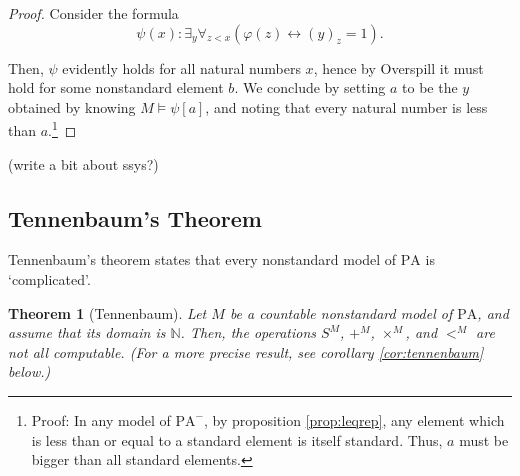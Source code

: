 \documentclass{article}
\newtheorem{theorem}{Theorem}[subsection]
\theoremstyle{nonumberplain}
\newtheorem{proof}{Proof}
\newcommand{\N}{\mathbb{N}}
\newcommand{\PA}{\mathrm{PA}}
\newcommand{\WPA}{\PA^-}
\begin{document}
\begin{proof}
Consider the formula
\begin{equation}
\psi(x) \colon \exists_y \forall_{z < x} (\varphi(z) \leftrightarrow (y)_z = 1).
\end{equation}

Then, $\psi$ evidently holds for all natural numbers $x$, hence by Overspill it must hold for some nonstandard element $b$. We conclude by setting $a$ to be the $y$ obtained by knowing $M \vDash \psi[a]$, and noting that every natural number is less than $a$.\footnote{Proof: In any model of $\WPA$, by proposition \ref{prop:leqrep}, any element which is less than or equal to a standard element is itself standard. Thus, $a$ must be bigger than all standard elements.}
\end{proof}

(write a bit about ssys?)

\subsection{Tennenbaum's Theorem}

Tennenbaum's theorem states that every nonstandard model of $\PA$ is `complicated'.

\begin{theorem}[Tennenbaum]\label{thm:tennenbaum}
Let $M$ be a countable nonstandard model of $\PA$, and assume that its domain is $\N$. Then, the operations $S^M$, $+^M$, $\times^M$, and $<^M$ are not all computable. (For a more precise result, see corollary \ref{cor:tennenbaum} below.)
\end{theorem}
\end{document}
